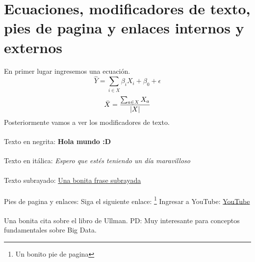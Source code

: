 \documentclass[conference, onecolumn]{IEEEtran}
\begin{document}
\section{Ecuaciones, modificadores de texto, pies de pagina y enlaces internos y externos}
%
En primer lugar ingresemos una ecuación.
% 
\begin{equation}
    \hat{Y} = \sum_{i \in X}{\beta_i X_i} + \beta_0 + \epsilon
\end{equation}
%
$$\Bar{X} = \frac{\sum_{a \in X}{X_a}}{|X|}$$
%
Posteriormente vamos a ver los modificadores de texto.
%
%
\\\\
Texto en negrita: 
\textbf{Hola mundo :D}
\\\\
Texto en itálica:
\textit{Espero que estés teniendo un día maravilloso}
\\\\
Texto subrayado:
\underline{Una bonita frase subrayada}
\\\\
Pies de pagina y enlaces:
Siga el siguiente enlace: \footnote{Un bonito pie de pagina}
Ingresar a YouTube: \href{https://www.youtube.com/}{YouTube}
%
\\\\
Una bonita cita sobre el libro de Ullman. PD: Muy interesante para conceptos fundamentales sobre Big Data. \cite{leskovec_mining_2020}


%


%

\end{document}

